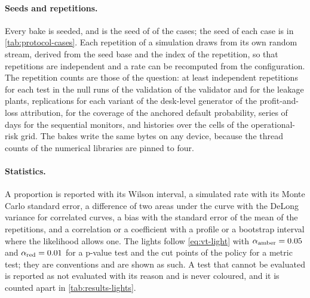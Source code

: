 \paragraph{Seeds and repetitions.} Every bake is seeded, and \rsSeedDefault{} is the seed of \rsSeedDefaultCases{} of the \rsCasesResult{} cases; the seed of each case is in \cref{tab:protocol-cases}. Each repetition of a simulation draws from its own random stream, derived from the seed base and the index of the repetition, so that repetitions are independent and a rate can be recomputed from the configuration. The repetition counts are those of the question: at least \pxOneNullReps{} independent repetitions for each test in the null runs of the validation of the validator and \pxOneLeakReps{} for the leakage plants, \pxThirteenN{} replications for each variant of the desk-level generator of the profit-and-loss attribution, \pxFourteenReps{} for the coverage of the anchored default probability, \pxFifteenReps{} series of \pxFifteenHorizon{} days for the sequential monitors, and \pxTwelveHistories{} histories over the \pxTwelveCells{} cells of the operational-risk grid. The bakes write the same bytes on any device, because the thread counts of the numerical libraries are pinned to four.

\paragraph{Statistics.} A proportion is reported with its Wilson interval, a simulated rate with its Monte Carlo standard error, a difference of two areas under the curve with the DeLong variance for correlated curves, a bias with the standard error of the mean of the repetitions, and a correlation or a coefficient with a profile or a bootstrap interval where the likelihood allows one. The
lights follow \cref{eq:vt-light} with $\alpha_{\mathrm{amber}}=0.05{}$ and $\alpha_{\mathrm{red}}=0.01{}$ for a p-value test and the cut points of the policy for a metric test; they are conventions and are shown as such. A test that cannot be evaluated is
reported as not evaluated with its reason and is never coloured, and it is counted apart in \cref{tab:results-lights}.

